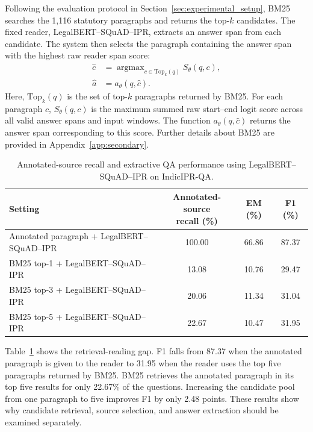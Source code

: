 \documentclass[pdflatex,sn-basic]{sn-jnl}%
\theoremstyle{thmstyleone}%
\theoremstyle{thmstyletwo}%
\theoremstyle{thmstylethree}%
\DeclareMathOperator*{\argmax}{argmax}
\newcommand{\fixedreader}{LegalBERT--SQuAD--IPR}
\begin{document}
Following the evaluation protocol in Section~\ref{sec:experimental_setup},
BM25 searches the 1,116 statutory paragraphs and returns the top-$k$
candidates. The fixed reader, \fixedreader{}, extracts an answer span from
each candidate. The system then selects the paragraph containing the answer
span with the highest raw reader span score:
\begin{align}
    \hat{c}
    &= \argmax_{c\in \mathrm{Top}_k(q)} S_{\theta}(q,c), \\
    \hat{a}
    &= a_{\theta}(q,\hat{c}).
    \label{eq:retrieve_read}
\end{align}
Here, $\mathrm{Top}_k(q)$ is the set of top-$k$ paragraphs returned by BM25.
For each paragraph $c$, $S_{\theta}(q,c)$ is the maximum summed raw
start--end logit score across all valid answer spans and input windows. The
function $a_{\theta}(q,\hat{c})$ returns the answer span corresponding to this
score. Further details about BM25 are provided in
Appendix~\ref{app:secondary}.

\begin{table}[!ht]
    \caption{Annotated-source recall and extractive QA performance using
    \fixedreader{} on IndicIPR-QA.}
    \label{tab:end_to_end_retrieval_qa}
    \centering
    \small
    \setlength{\tabcolsep}{4pt}
    \begin{tabular}{lccc}
        \toprule
        Setting & \shortstack{Annotated-source\\recall (\%)} &
        EM (\%) & F1 (\%) \\
        \midrule
        Annotated paragraph + \fixedreader{} & 100.00 & 66.86 & 87.37 \\
        BM25 top-1 + \fixedreader{}           & 13.08  & 10.76 & 29.47 \\
        BM25 top-3 + \fixedreader{}           & 20.06  & 11.34 & 31.04 \\
        BM25 top-5 + \fixedreader{}           & 22.67  & 10.47 & 31.95 \\
        \bottomrule
    \end{tabular}
\end{table}

Table~\ref{tab:end_to_end_retrieval_qa} shows the retrieval-reading gap.
F1 falls from 87.37 when the annotated paragraph is given to the reader to
31.95 when the reader uses the top five paragraphs returned by BM25.
BM25 retrieves the annotated paragraph in its top five results for only
22.67\% of the questions. Increasing the candidate pool from one paragraph
to five improves F1 by only 2.48 points. These results show why candidate
retrieval, source selection, and answer extraction should be examined
separately.
\end{document}

